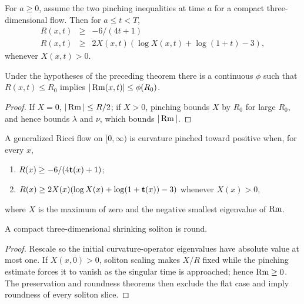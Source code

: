 \begin{theorem}
\label{thm:pinching-persists-from-time-a}
\label{pincha}
For $a\ge0$, assume the two pinching inequalities at time $a$ for a compact
three-dimensional flow. Then for $a\le t<T$,
\begin{eqnarray}\label{Rlower}
R(x,t)&\ge&-6/(4t+1)\\\label{RXineq}
R(x,t)&\ge&2X(x,t)(\log X(x,t)+\log(1+t)-3),
\end{eqnarray}
whenever $X(x,t)>0$.
\end{theorem}

\begin{corollary}
\label{cor:curvature-bound-from-scalar-pinching}

Under the hypotheses of the preceding theorem there is a continuous $\phi$
such that $R(x,t)\le R_0$ implies $|\operatorname{Rm}(x,t)|\le\phi(R_0)$.
\end{corollary}
\begin{proof}
\sketch If $X=0$, $|\operatorname{Rm}|\le R/2$; if $X>0$, pinching bounds $X$ by $R_0$
for large $R_0$, and hence bounds $\lambda$ and $\nu$, which bounds $|\operatorname{Rm}|$.
\end{proof}

\begin{definition}
\label{def:curvature-pinched-toward-positive}
\label{pinchd}
A generalized Ricci flow on $[0,\infty)$ is curvature pinched toward positive
when, for every $x$,
\begin{enumerate}
\item $R(x)\ge-6/(4{\bf t}(x)+1)$;
\item $R(x)\ge2X(x)(\log X(x)+\log(1+{\bf t}(x))-3)$ whenever $X(x)>0$,
\end{enumerate}
where $X$ is the maximum of zero and the negative smallest eigenvalue of
$\operatorname{Rm}$.
\end{definition}

\begin{theorem}
\label{thm:shrinking-soliton-round}
A compact three-dimensional shrinking soliton is round.
\end{theorem}
\begin{proof}
\sketch Rescale so the initial curvature-operator eigenvalues have absolute
value at most one. If $X(x,0)>0$, soliton scaling makes $X/R$ fixed while
the pinching estimate forces it to vanish as the singular time is approached;
hence $\operatorname{Rm}\ge0$. The preservation and roundness theorems then exclude the
flat case and imply roundness of every soliton slice.
\end{proof}


